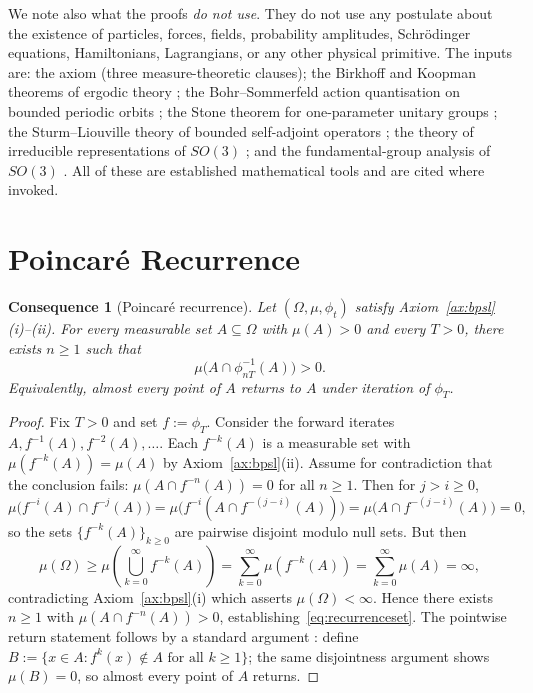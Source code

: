 \documentclass[11pt,twocolumn,a4paper]{article}
\theoremstyle{axiomstyle}
\theoremstyle{conseqstyle}
\newtheorem{consequence}{Consequence}
\theoremstyle{definition}
\theoremstyle{remark}
\begin{document}
We note also what the proofs \emph{do not use}. They do not use any postulate about the existence of particles, forces, fields, probability amplitudes, Schr\"odinger equations, Hamiltonians, Lagrangians, or any other physical primitive. The inputs are: the axiom (three measure-theoretic clauses); the Birkhoff and Koopman theorems of ergodic theory \citep{birkhoff1931,koopman1931,walters1982}; the Bohr--Sommerfeld action quantisation on bounded periodic orbits \citep{bohr1913,sommerfeld1915,einstein1917}; the Stone theorem for one-parameter unitary groups \citep{reed1980}; the Sturm--Liouville theory of bounded self-adjoint operators \citep{arfkenweber2005}; the theory of irreducible representations of $SO(3)$ \citep{wigner1959}; and the fundamental-group analysis of $SO(3)$ \citep{nakahara2003}. All of these are established mathematical tools and are cited where invoked.

\section{Poincar\'e Recurrence}
\label{sec:poincare}

\begin{consequence}[Poincar\'e recurrence]
\label{cons:poincare}
Let $(\Omega,\mu,\phi_{t})$ satisfy Axiom~\ref{ax:bpsl}(i)--(ii). For every measurable set $A\subseteq\Omega$ with $\mu(A)>0$ and every $T>0$, there exists $n\ge 1$ such that
\begin{equation}
\mu\bigl(A\cap\phi_{nT}^{-1}(A)\bigr)>0.
\label{eq:recurrenceset}
\end{equation}
Equivalently, almost every point of $A$ returns to $A$ under iteration of $\phi_{T}$.
\end{consequence}

\begin{proof}
Fix $T>0$ and set $f:=\phi_{T}$. Consider the forward iterates $A, f^{-1}(A), f^{-2}(A),\ldots$. Each $f^{-k}(A)$ is a measurable set with $\mu(f^{-k}(A))=\mu(A)$ by Axiom~\ref{ax:bpsl}(ii). Assume for contradiction that the conclusion fails: $\mu(A\cap f^{-n}(A))=0$ for all $n\ge 1$. Then for $j>i\ge 0$,
\begin{equation*}
\mu\bigl(f^{-i}(A)\cap f^{-j}(A)\bigr)=\mu\bigl(f^{-i}(A\cap f^{-(j-i)}(A))\bigr)=\mu\bigl(A\cap f^{-(j-i)}(A)\bigr)=0,
\end{equation*}
so the sets $\{f^{-k}(A)\}_{k\ge 0}$ are pairwise disjoint modulo null sets. But then
\begin{equation*}
\mu(\Omega)\ge \mu\!\left(\bigcup_{k=0}^{\infty}f^{-k}(A)\right)=\sum_{k=0}^{\infty}\mu(f^{-k}(A))=\sum_{k=0}^{\infty}\mu(A)=\infty,
\end{equation*}
contradicting Axiom~\ref{ax:bpsl}(i) which asserts $\mu(\Omega)<\infty$. Hence there exists $n\ge 1$ with $\mu(A\cap f^{-n}(A))>0$, establishing~\eqref{eq:recurrenceset}. The pointwise return statement follows by a standard argument \citep{walters1982}: define $B:=\{x\in A: f^{k}(x)\notin A \text{ for all } k\ge 1\}$; the same disjointness argument shows $\mu(B)=0$, so almost every point of $A$ returns.
\end{proof}
\end{document}

